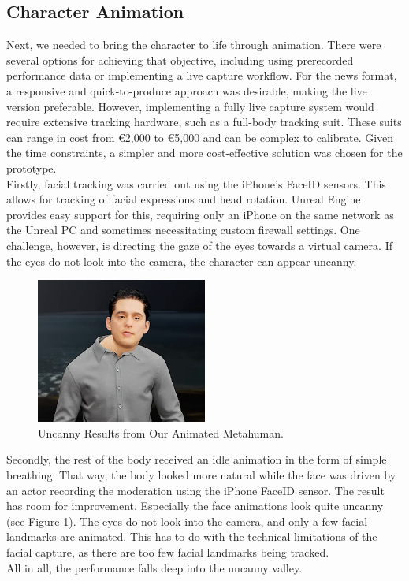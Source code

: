 \documentclass[
  a4paper,  %
  twoside,  %
  bibliography=totoc,
  headsepline,
  cleardoublepage=empty,
  parskip=half,
  draft=false
]{scrbook}
\begin{document}
\subsection*{Character Animation}
Next, we needed to bring the character to life through animation. There were several options for achieving that objective, including using prerecorded performance data or implementing a live capture workflow. For the news format, a responsive and quick-to-produce approach was desirable, making the live version preferable. However, implementing a fully live capture system would require extensive tracking hardware, such as a full-body tracking suit. These suits can range in cost from €2,000 to €5,000 and can be complex to calibrate. Given the time constraints, a simpler and more cost-effective solution was chosen for the prototype. \\
Firstly, facial tracking was carried out using the iPhone's FaceID sensors. This allows for tracking of facial expressions and head rotation. Unreal Engine provides easy support for this, requiring only an iPhone on the same network as the Unreal PC and sometimes necessitating custom firewall settings. One challenge, however, is directing the gaze of the eyes towards a virtual camera. If the eyes do not look into the camera, the character can appear uncanny. 

\begin{figure}[h]
  \centering
  \includegraphics[width=0.5\textwidth]{graphics/unreal-engine/MH/bent-head.png}
  \caption{Uncanny Results from Our Animated Metahuman.}
  \label{fig:uncanny mh}
\end{figure}

Secondly, the rest of the body received an idle animation in the form of simple breathing. That way, the body looked more natural while the face was driven by an actor recording the moderation using the iPhone FaceID sensor. The result has room for improvement. Especially the face animations look quite uncanny (see Figure \ref{fig:uncanny mh}). The eyes do not look into the camera, and only a few facial landmarks are animated. This has to do with the technical limitations of the facial capture, as there are too few facial landmarks being tracked. \\
All in all, the performance falls deep into the uncanny valley.
\end{document}
